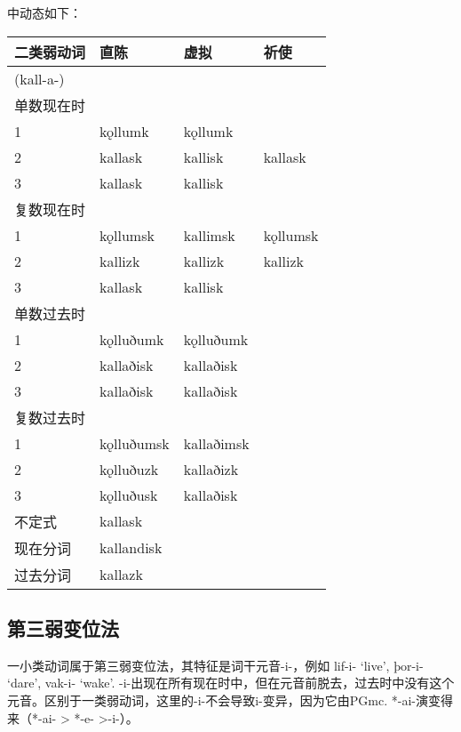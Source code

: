 中动态如下：

\begin{longtable}{llll}
  \toprule
  二类弱动词 & 直陈       & 虚拟       & 祈使     \\
  \midrule
  \endhead
  \bottomrule
  \endfoot
  (kall-a-)  &            &            &          \\
  单数现在时 &            &            &          \\
  1          & kǫllumk    & kǫllumk    &          \\
  2          & kallask    & kallisk    & kallask  \\
  3          & kallask    & kallisk    &          \\
  复数现在时 &            &            &          \\
  1          & kǫllumsk   & kallimsk   & kǫllumsk \\
  2          & kallizk    & kallizk    & kallizk  \\
  3          & kallask    & kallisk    &          \\
  单数过去时 &            &            &          \\
  1          & kǫlluðumk  & kǫlluðumk  &          \\
  2          & kallaðisk  & kallaðisk  &          \\
  3          & kallaðisk  & kallaðisk  &          \\
  复数过去时 &            &            &          \\
  1          & kǫlluðumsk & kallaðimsk &          \\
  2          & kǫlluðuzk  & kallaðizk  &          \\
  3          & kǫlluðusk  & kallaðisk  &          \\
  不定式     & kallask    &            &          \\
  现在分词   & kallandisk &            &          \\
  过去分词   & kallazk    &            &          \\
\end{longtable}

\subsection{第三弱变位法}\label{第三弱变位法}

一小类动词属于第三弱变位法，其特征是词干元音-i-，例如 lif-i- `live‌',
þor-i- `dare‌', vak-i- `wake‌'.
-i-出现在所有现在时中，但在元音前脱去，过去时中没有这个元音。区别于一类弱动词，这里的-i-不会导致i-变异，因为它由PGmc.
*-ai-演变得来（*-ai- \textgreater{} *-e- \textgreater-i-）。


